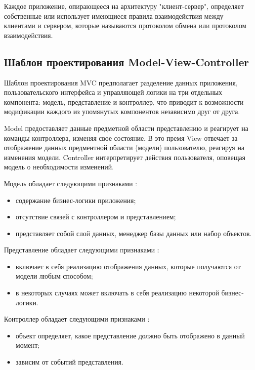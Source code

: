 Каждое приложение, опирающееся на архитектуру "клиент-сервер", определяет собственные или использует имеющиеся правила взаимодействия между клиентами и сервером, которые называются протоколом обмена или протоколом взаимодействия. \cite{clientServerProt}

\subsection{Шаблон проектирования Model-View-Controller}
Шаблон проектирования MVC предполагает разделение данных приложения, пользовательского интерфейса и управляющей логики на три отдельных компонента: модель, представление и контроллер, что приводит к возможности модификации каждого из упомянутых компонентов независимо друг от друга. \cite{mvcInfo}

Model предоставляет данные предметной области представлению и реагирует на команды контроллера, изменяя свое состояние. В это премя View отвечает за отображение данных предментной области (модели) пользователю, реагируя на изменения модели. Controller интерпретирует действия пользователя, оповещая модель о необходимости изменений. \cite{mvcInfo}

Модель обладает следующими признаками \cite{mvcHabr}:
\begin{itemize}[leftmargin=1.6\parindent]
\item содержание бизнес-логики приложения;
\item отсутствие связей с контроллером и представлением;
\item представляет собой слой данных, менеджер базы данных или набор объектов.
\end{itemize}

Представление обладает следующими признаками \cite{mvcHabr}:
\begin{itemize}[leftmargin=1.6\parindent]
\item включает в себя реализацию отображения данных, которые получаются от модели любым способом;
\item в некоторых случаях может включать в себя реализацию некоторой бизнес-логики.
\end{itemize}

Контроллер обладает следующими признаками \cite{mvcHabr}:
\begin{itemize}[leftmargin=1.6\parindent]
\item объект определяет, какое представление должно быть отображено в данный момент;
\item зависим от событий представления.
\end{itemize}

